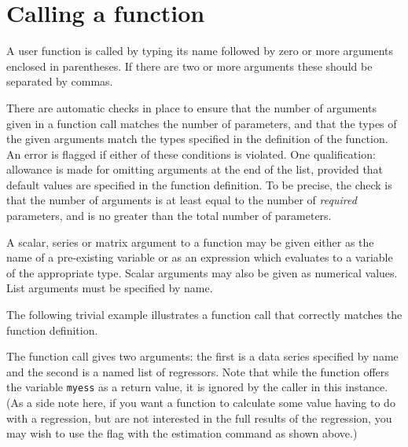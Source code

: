 \section{Calling a function}
\label{func-call}

A user function is called by typing its name followed by zero or more
arguments enclosed in parentheses.  If there are two or more arguments
these should be separated by commas.  

There are automatic checks in place to ensure that the number of
arguments given in a function call matches the number of parameters,
and that the types of the given arguments match the types specified in
the definition of the function.  An error is flagged if either of
these conditions is violated.  One qualification: allowance is made
for omitting arguments at the end of the list, provided that default
values are specified in the function definition.  To be precise, the
check is that the number of arguments is at least equal to the number
of \textit{required} parameters, and is no greater than the total
number of parameters.

A scalar, series or matrix argument to a function may be given either
as the name of a pre-existing variable or as an expression which
evaluates to a variable of the appropriate type.  Scalar arguments may
also be given as numerical values.  List arguments must be specified
by name.

The following trivial example illustrates a function call that
correctly matches the function definition.
    

The function call gives two arguments: the first is a data series
specified by name and the second is a named list of regressors.  Note
that while the function offers the variable \verb+myess+ as a return
value, it is ignored by the caller in this instance.  (As a side note
here, if you want a function to calculate some value having to do with
a regression, but are not interested in the full results of the
regression, you may wish to use the  flag with the
estimation command as shown above.)
    
